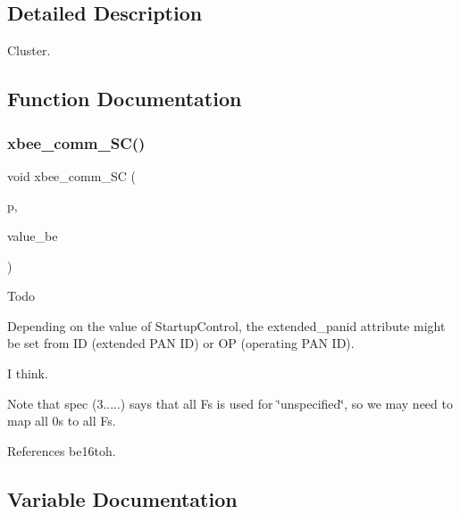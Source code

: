 \subsection{Detailed Description}
Cluster. 



\subsection{Function Documentation}
\mbox{\label{group__xbee__commissioning_ga886012f757de4a74d0c992d3ab04a373}} 
\subsubsection{\texorpdfstring{xbee\+\_\+comm\+\_\+\+S\+C()}{xbee\_comm\_SC()}}
{\footnotesize\ttfamily void xbee\+\_\+comm\+\_\+\+SC (\begin{DoxyParamCaption}\item[{\hyperlink{structzcl__comm__startup__param__t}{zcl\+\_\+comm\+\_\+startup\+\_\+param\+\_\+t} \hyperlink{group__hal_gaef060b3456fdcc093a7210a762d5f2ed}{F\+AR} $\ast$}]{p,  }\item[{const void \hyperlink{group__hal_gaef060b3456fdcc093a7210a762d5f2ed}{F\+AR} $\ast$}]{value\+\_\+be }\end{DoxyParamCaption})}

\begin{DoxyRefDesc}{Todo}
\item[\hyperlink{todo__todo000010}{Todo}]Depending on the value of Startup\+Control, the extended\+\_\+panid attribute might be set from ID (extended P\+AN ID) or OP (operating P\+AN ID).\end{DoxyRefDesc}


I think.

Note that spec (3.....) says that all Fs is used for \char`\"{}unspecified\char`\"{}, so we may need to map all 0s to all Fs. 

References be16toh.



\subsection{Variable Documentation}
\mbox{\label{group__xbee__commissioning_ga010b1bb0118167125a07e4bde6db5e36}} 
